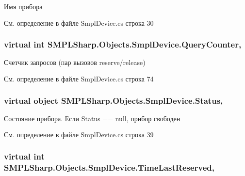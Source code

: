 Имя прибора 



См. определение в файле Smpl\-Device.\-cs строка 30

\hypertarget{class_s_m_p_l_sharp_1_1_objects_1_1_smpl_device_a675ca052cc3996e38aec7ccc1dd7ca8c}{
\subsubsection[{Query\-Counter}]{\setlength{\rightskip}{0pt plus 5cm}virtual int S\-M\-P\-L\-Sharp.\-Objects.\-Smpl\-Device.\-Query\-Counter\hspace{0.3cm}{\ttfamily [get]}, {\ttfamily [set]}}}\label{d7/d39/class_s_m_p_l_sharp_1_1_objects_1_1_smpl_device_a675ca052cc3996e38aec7ccc1dd7ca8c}


Счетчик запросов (пар вызовов reserve/release) 



См. определение в файле Smpl\-Device.\-cs строка 74

\hypertarget{class_s_m_p_l_sharp_1_1_objects_1_1_smpl_device_a2e79fee0f480adec487fdf013ed52b2a}{
\subsubsection[{Status}]{\setlength{\rightskip}{0pt plus 5cm}virtual object S\-M\-P\-L\-Sharp.\-Objects.\-Smpl\-Device.\-Status\hspace{0.3cm}{\ttfamily [get]}, {\ttfamily [set]}}}\label{d7/d39/class_s_m_p_l_sharp_1_1_objects_1_1_smpl_device_a2e79fee0f480adec487fdf013ed52b2a}


Состояние прибора. Если Status == null, прибор свободен 



См. определение в файле Smpl\-Device.\-cs строка 39

\hypertarget{class_s_m_p_l_sharp_1_1_objects_1_1_smpl_device_a8757abb401c1dfa7093ced84f715a2d2}{
\subsubsection[{Time\-Last\-Reserved}]{\setlength{\rightskip}{0pt plus 5cm}virtual int S\-M\-P\-L\-Sharp.\-Objects.\-Smpl\-Device.\-Time\-Last\-Reserved\hspace{0.3cm}{\ttfamily [get]}, {\ttfamily [set]}}}\label{d7/d39/class_s_m_p_l_sharp_1_1_objects_1_1_smpl_device_a8757abb401c1dfa7093ced84f715a2d2}


